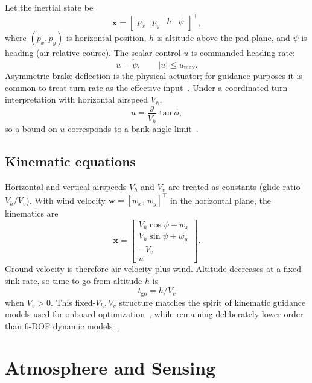 \documentclass[conference]{IEEEtran}
\begin{document}
Let the inertial state be
\begin{equation}
\mathbf{x}
=
\begin{bmatrix}
p_x & p_y & h & \psi
\end{bmatrix}^{\!\top},
\label{eq:state}
\end{equation}
where $(p_x,p_y)$ is horizontal position, $h$ is altitude above the pad plane, and $\psi$ is heading (air-relative course).
The scalar control $u$ is commanded heading rate:
\begin{equation}
u = \dot{\psi},
\qquad
|u| \le u_{\max}.
\label{eq:u}
\end{equation}
Asymmetric brake deflection is the physical actuator; for guidance purposes it is common to treat turn rate as the effective input~\cite{SlegersCostello2003}.
Under a coordinated-turn interpretation with horizontal airspeed $V_h$,
\begin{equation}
u = \frac{g}{V_h}\tan\phi,
\label{eq:coord}
\end{equation}
so a bound on $u$ corresponds to a bank-angle limit~\cite{Etkin1996}.

\subsection{Kinematic equations}

Horizontal and vertical airspeeds $V_h$ and $V_v$ are treated as constants (glide ratio $V_h/V_v$).
With wind velocity $\mathbf{w}=[w_x,\,w_y]^{\top}$ in the horizontal plane, the kinematics are
\begin{equation}
\dot{\mathbf{x}}
=
\begin{bmatrix}
V_h\cos\psi + w_x \\
V_h\sin\psi + w_y \\
-V_v \\
u
\end{bmatrix}.
\label{eq:dyn}
\end{equation}
Ground velocity is therefore air velocity plus wind.
Altitude decreases at a fixed sink rate, so time-to-go from altitude $h$ is
\begin{equation}
t_{\mathrm{go}} = h / V_v
\label{eq:tgo}
\end{equation}
when $V_v>0$.
This fixed-$V_h,V_v$ structure matches the spirit of kinematic guidance models used for onboard optimization~\cite{Leeman2022}, while remaining deliberately lower order than 6-DOF dynamic models~\cite{Zhao2023,Wei2024}.

\section{Atmosphere and Sensing}
\end{document}
